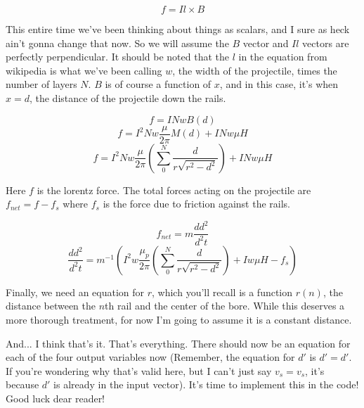 \documentclass{article}
\begin{document}
\[ f = Il\times B \]

This entire time we've been thinking about things as scalars, and I sure as heck ain't gonna change that now. So we will assume the $B$ vector and $Il$ vectors are perfectly perpendicular. It should be noted that the $l$ in the equation from wikipedia is what we've been calling $w$, the width of the projectile, times the number of layers $N$. $B$ is of course a function of $x$, and in this case, it's when $x=d$, the distance of the projectile down the rails.

\[f = INwB(d) \]
\[f = I^2Nw\frac{\mu}{2\pi}M(d) + INw\mu H \]
\[f = I^2Nw\frac{\mu}{2\pi}\left(\sum_0^N \frac{d}{r\sqrt{r^2-d^2}}\right) + INw\mu H \]

Here $f$ is the lorentz force. The total forces acting on the projectile are $f_{net}=f-f_s$ where $f_s$ is the force due to friction against the rails.

\[f_{net}=m\frac{dd^2}{d^2t} \]
\[\frac{dd^2}{d^2t} = m^{-1}\left(I^2w\frac{\mu_p}{2\pi}\left(\sum_0^N \frac{d}{r\sqrt{r^2-d^2}}\right) + Iw\mu H - f_s\right) \]

Finally, we need an equation for $r$, which you'll recall is a function $r(n)$, the distance between the $n$th rail and the center of the bore. While this deserves a more thorough treatment, for now I'm going to assume it is a constant distance.

And... I think that's it. That's everything. There should now be an equation for each of the four output variables now (Remember, the equation for $d'$ is $d'=d'$. If you're wondering why that's valid here, but I can't just say $v_s = v_s$, it's because $d'$ is already in the input vector). It's time to implement this in the code! Good luck dear reader!
\end{document}
